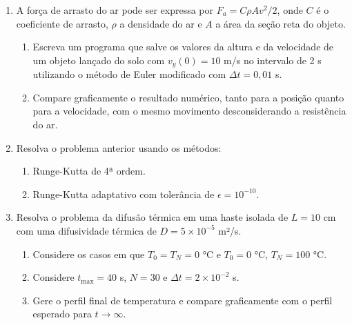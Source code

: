 \documentclass{article}
\begin{document}
\begin{enumerate}
    \item A força de arrasto do ar pode ser expressa por $F_a = C \rho A v^2 /2$, onde $C$ é o coeficiente de arrasto, $\rho$ a densidade do ar e $A$ a área da seção reta do objeto.
    \begin{enumerate}
        \item Escreva um programa que salve os valores da altura e da velocidade de um objeto lançado do solo com $v_y(0) = 10$ m/s no intervalo de 2 s utilizando o método de Euler modificado com $\Delta t = 0,01$ s.
        \item Compare graficamente o resultado numérico, tanto para a posição quanto para a velocidade, com o mesmo movimento desconsiderando a resistência do ar.
    \end{enumerate}
    
    \item Resolva o problema anterior usando os métodos:
    \begin{enumerate}
        \item Runge-Kutta de 4ª ordem.
        \item Runge-Kutta adaptativo com tolerância de $\epsilon = 10^{-10}$.
    \end{enumerate}
    
    \item Resolva o problema da difusão térmica em uma haste isolada de $L = 10$ cm com uma difusividade térmica de $D = 5 \times 10^{-5}$ m²/s.
    \begin{enumerate}
        \item Considere os casos em que $T_0 = T_N = 0$ °C e $T_0 = 0$ °C, $T_N = 100$ °C.
        \item Considere $t_{\max} = 40$ s, $N = 30$ e $\Delta t = 2 \times 10^{-2}$ s.
        \item Gere o perfil final de temperatura e compare graficamente com o perfil esperado para $t \to \infty$.
    \end{enumerate}
\end{enumerate}
\end{document}
